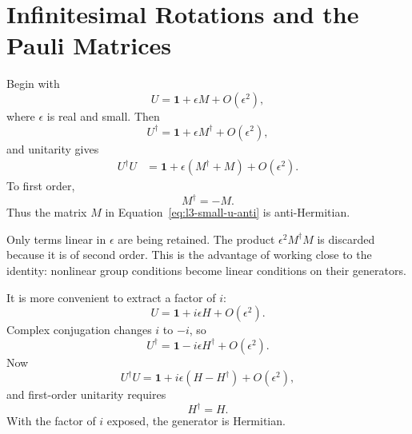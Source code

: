 \section{Infinitesimal Rotations and the Pauli Matrices}

\begin{classroomqa}
\end{classroomqa}

Begin with
\begin{equation}
U=\boldsymbol 1+\epsilon M+O(\epsilon^2),
\label{eq:l3-small-u-anti}
\end{equation}
where \(\epsilon\) is real and small. Then
\begin{equation}
U^\dagger=\boldsymbol 1+\epsilon M^\dagger+O(\epsilon^2),
\end{equation}
and unitarity gives
\begin{align}
U^\dagger U
 &=\boldsymbol 1+\epsilon(M^\dagger+M)+O(\epsilon^2).
\end{align}
To first order,
\begin{equation}
M^\dagger=-M.
\end{equation}
Thus the matrix \(M\) in Equation~\eqref{eq:l3-small-u-anti} is
anti-Hermitian.

Only terms linear in \(\epsilon\) are being retained. The product
\(\epsilon^2M^\dagger M\) is discarded because it is of second order. This is
the advantage of working close to the identity: nonlinear group conditions
become linear conditions on their generators.

It is more convenient to extract a factor of \(i\):
\begin{equation}
U=\boldsymbol 1+i\epsilon H+O(\epsilon^2).
\label{eq:l3-small-u-herm}
\end{equation}
Complex conjugation changes \(i\) to \(-i\), so
\begin{equation}
U^\dagger=\boldsymbol 1-i\epsilon H^\dagger+O(\epsilon^2).
\end{equation}
Now
\begin{equation}
U^\dagger U
=\boldsymbol 1+i\epsilon(H-H^\dagger)+O(\epsilon^2),
\end{equation}
and first-order unitarity requires
\begin{equation}
H^\dagger=H.
\end{equation}
With the factor of \(i\) exposed, the generator is Hermitian.

